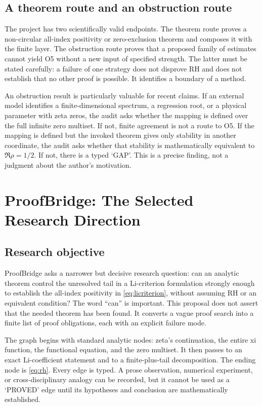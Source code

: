 \documentclass[conference]{../../../../Conference-LaTeX-template_10-17-19/IEEEtran}
\begin{document}
\subsection{A theorem route and an obstruction route}
The project has two scientifically valid endpoints. The theorem route proves a non-circular all-index positivity or zero-exclusion theorem and composes it with the finite layer. The obstruction route proves that a proposed family of estimates cannot yield O5 without a new input of specified strength. The latter must be stated carefully: a failure of one strategy does not disprove RH and does not establish that no other proof is possible. It identifies a boundary of a method.

An obstruction result is particularly valuable for recent claims. If an external model identifies a finite-dimensional spectrum, a regression root, or a physical parameter with zeta zeros, the audit asks whether the mapping is defined over the full infinite zero multiset. If not, finite agreement is not a route to O5. If the mapping is defined but the invoked theorem gives only stability in another coordinate, the audit asks whether that stability is mathematically equivalent to $\Re\rho=1/2$. If not, there is a typed `GAP'. This is a precise finding, not a judgment about the author's motivation.
\section{ProofBridge: The Selected Research Direction}
\subsection{Research objective}
ProofBridge asks a narrower but decisive research question: can an analytic theorem control the unresolved tail in a Li-criterion formulation strongly enough to establish the all-index positivity in \eqref{eq:licriterion}, without assuming RH or an equivalent condition? The word ``can'' is important. This proposal does not assert that the needed theorem has been found. It converts a vague proof search into a finite list of proof obligations, each with an explicit failure mode.

The graph begins with standard analytic nodes: zeta's continuation, the entire xi function, the functional equation, and the zero multiset. It then passes to an exact Li-coefficient statement and to a finite-plus-tail decomposition. The ending node is \eqref{eq:rh}. Every edge is typed. A prose observation, numerical experiment, or cross-disciplinary analogy can be recorded, but it cannot be used as a `PROVED' edge until its hypotheses and conclusion are mathematically established.
\end{document}

